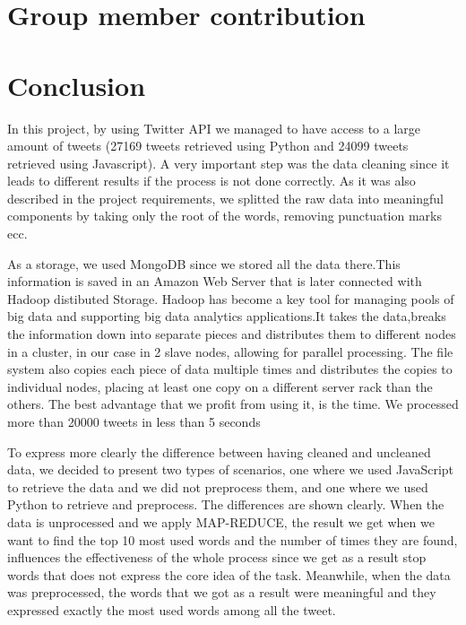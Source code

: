 \documentclass{article}
\begin{document}
	    \section{Group member contribution}
        \section{Conclusion}
In this project, by using Twitter API we managed to have access to a large amount of tweets (27169 tweets retrieved using Python and 24099 tweets retrieved using Javascript). A very important step was the data cleaning since it leads to different results if the process is not done correctly. As it was also described in the project requirements, we splitted the raw data into meaningful components by taking only the root of the words, removing punctuation marks ecc.

 As a storage, we used MongoDB since we stored all the data there.This information is saved in an Amazon Web Server that is later connected with Hadoop distibuted Storage. Hadoop has become a key tool for managing pools of big data and supporting big data analytics applications.It takes the data,breaks the information down into separate pieces and distributes them to different nodes in a cluster, in our case in 2 slave nodes, allowing for parallel processing. The file system also copies each piece of data multiple times and distributes the copies to individual nodes, placing at least one copy on a different server rack than the others. The best advantage that we profit from using it, is the time. We processed more than 20000 tweets in less than 5 seconds

To express more clearly the difference between having cleaned and uncleaned data, we decided to present two types of scenarios, one where we used JavaScript to retrieve the data and we did not preprocess them, and one where we used Python to retrieve and preprocess. The differences are shown clearly. When the data is unprocessed and we apply MAP-REDUCE, the result we get when we want to find the top 10 most used words and the number of times they are found, influences the effectiveness of the whole process since we get as a result stop words that does not express the core idea of the task. Meanwhile, when the data was preprocessed, the words that we got as a result were meaningful and they expressed exactly the most used words among all the tweet.


      
    
    
    \nocite{*}
\end{document}

